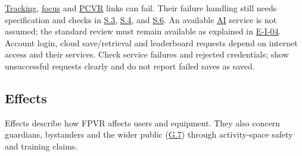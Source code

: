 \documentclass[12pt]{article}
\begin{document}
\hyperlink{glos:Tracking}{Tracking}, \hyperlink{glos:Focus}{focus} and \hyperlink{glos:PCVR}{PCVR} links can fail. Their failure handling still needs
specification and checks in \hyperref[s3]{S.3}, \hyperref[s4]{S.4}, and
\hyperref[s6]{S.6}. An available \hyperlink{glos:AI}{AI} service is not assumed; the standard review
must remain available as explained in \hyperref[ei-review]{E-I-04}.
Account login, cloud save/retrieval and leaderboard requests depend on internet
access and their services. Check service failures and rejected credentials;
show unsuccessful requests clearly and do not report failed saves as saved.

\subsection{Effects}\label{e4}

Effects describe how FPVR affects users and equipment. They also concern
guardians, bystanders and the wider public (\hyperref[g7]{G.7}) through
activity-space safety and training claims.
\end{document}
